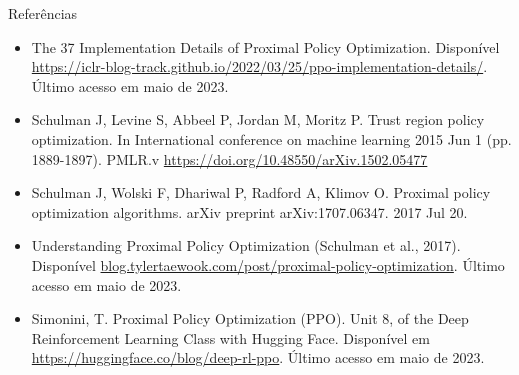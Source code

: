 \documentclass{beamer}
\begin{document}
	
\begin{frame}{Referências}
	
	\small
	\begin{itemize}
		
		\item The 37 Implementation Details of Proximal Policy Optimization. Disponível \href{https://iclr-blog-track.github.io/2022/03/25/ppo-implementation-details/}{https://iclr-blog-track.github.io/2022/03/25/ppo-implementation-details/}. Último acesso em maio de 2023. 
		
		\item Schulman J, Levine S, Abbeel P, Jordan M, Moritz P. Trust region policy optimization. In International conference on machine learning 2015 Jun 1 (pp. 1889-1897). PMLR.v \href{https://doi.org/10.48550/arXiv.1502.05477}{https://doi.org/10.48550/arXiv.1502.05477}
		
		\item Schulman J, Wolski F, Dhariwal P, Radford A, Klimov O. Proximal policy optimization algorithms. arXiv preprint arXiv:1707.06347. 2017 Jul 20.
		
		\item Understanding Proximal Policy Optimization (Schulman et al., 2017). Disponível \href{https://blog.tylertaewook.com/post/proximal-policy-optimization}{blog.tylertaewook.com/post/proximal-policy-optimization}. Último acesso em maio de 2023. 
		
		\item Simonini, T. Proximal Policy Optimization (PPO). Unit 8, of the Deep Reinforcement Learning Class with Hugging Face. Disponível em \href{https://huggingface.co/blog/deep-rl-ppo}{https://huggingface.co/blog/deep-rl-ppo}. Último acesso em maio de 2023.
	\end{itemize}
\end{frame}
		
\end{document}
